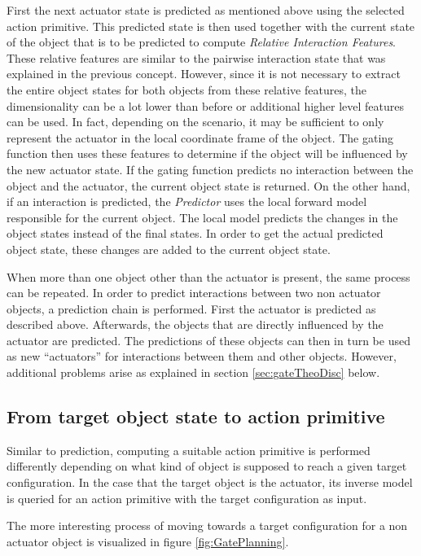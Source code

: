 First the next actuator state is predicted as mentioned above using the selected action primitive.
This predicted state is then used together with the current state of the object that is to be predicted to compute \textit{Relative Interaction Features}. These relative features are similar to the pairwise interaction state that was explained in the previous concept. However, since it is not necessary to extract the entire object states for both objects from these relative features, the dimensionality can be a lot lower than before or additional higher level features can be used. In fact, depending on the scenario, it may be sufficient to only represent the actuator in the local coordinate frame of the object. 
The gating function then uses these features to determine if the object will be influenced by the new actuator state. If the gating function predicts no interaction between the object and the actuator, the current object state is returned. 
On the other hand, if an interaction is predicted, the \textit{Predictor} uses the local forward model responsible for the current object. 
The local model predicts the changes in the object states instead of the final states. In order to get the actual predicted object state, these changes are added to the current object state.

When more than one object other than the actuator is present, the same process can be repeated. 
In order to predict interactions between two non actuator objects, a prediction chain is performed. First the actuator is predicted as described above. Afterwards, the objects that are directly influenced by the actuator are predicted. 
The predictions of these objects can then in turn be used as new \enquote{actuators} for interactions between them and other objects. However, additional problems arise as explained in section \ref{sec:gateTheoDisc} below.

\subsection{From target object state to action primitive \label{sec:gatePlanning}}

Similar to prediction, computing a suitable action primitive is performed differently depending on what kind of object is supposed to reach a given target configuration. In the case that the target object is the actuator, its inverse model is queried for an action primitive with the target configuration as input. 

The more interesting process of moving towards a target configuration for a non actuator object is visualized in figure \ref{fig:GatePlanning}.

